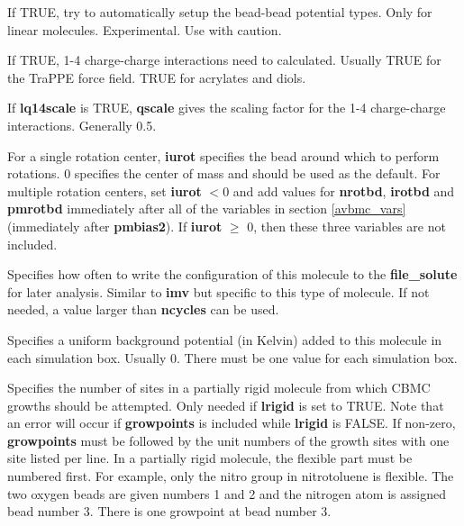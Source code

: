\documentclass[12pt,letterpaper]{article}
\begin{document}



 If TRUE, try to automatically setup
the bead-bead potential types. Only for linear molecules.
Experimental. Use with caution.

 If TRUE, 1-4 charge-charge
interactions need to calculated. Usually TRUE for the TraPPE
force field. TRUE for acrylates and diols.

 If {\bf lq14scale} is TRUE, {\bf
  qscale} gives the scaling factor for the 1-4 charge-charge
interactions. Generally 0.5.

 For a single rotation center, {\bf
  iurot} specifies the bead around which to perform
rotations. 0 specifies the center of mass and should be used
as the default. For multiple rotation centers, set {\bf
  iurot} $< 0$ and add values for \textbf{nrotbd},
\textbf{irotbd} and \textbf{pmrotbd} immediately after all
of the variables in section \ref{avbmc_vars} (immediately
after {\bf pmbias2}). If {\bf iurot} $\ge$ 0, then these
three variables are not included.

 Specifies how often to write the
configuration of this molecule to the {\bf file\_solute} for
later analysis. Similar to {\bf imv} but specific to this
type of molecule. If not needed, a value larger than {\bf
  ncycles} can be used.

 Specifies a uniform background potential
(in Kelvin) added to this molecule in each simulation box.
Usually 0. There must be one value for each simulation box.

 Specifies the number of sites in
a partially rigid molecule from which CBMC growths should be
attempted. Only needed if {\bf lrigid} is set to TRUE. Note
that an error will occur if {\bf growpoints} is included
while {\bf lrigid} is FALSE. If non-zero, {\bf growpoints}
must be followed by the unit numbers of the growth sites
with one site listed per line. In a partially rigid
molecule, the flexible part must be numbered first. For
example, only the nitro group in nitrotoluene is flexible.
The two oxygen beads are given numbers 1 and 2 and the
nitrogen atom is assigned bead number 3. There is one
growpoint at bead number 3.
\end{document}
